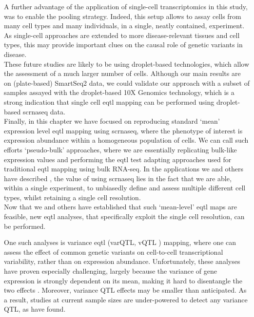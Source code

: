 A further advantage of the application of single-cell transcriptomics in this study, was to enable the pooling strategy. 
Indeed, this setup allows to assay cells from many cell types and many individuals, in a single, neatly contained, experiment.
As single-cell approaches are extended to more disease-relevant tissues and cell types, this may provide important clues on the causal role of genetic variants in disease. \\

These future studies are likely to be using droplet-based technologies, which allow the assessment of a much larger number of cells.
Although our main results are on (plate-based) SmartSeq2 data, we could validate our approach with a subset of samples assayed with the droplet-based 10X Genomics technology, which is a strong indication that single cell \gls{eqtl} mapping can be performed using droplet-based \gls{scrnaseq} data. \\

Finally, in this chapter we have focused on reproducing standard `mean' expression level \gls{eqtl} mapping using \gls{scrnaseq}, where the phenotype of interest is expression abundance within a homogeneous population of cells.
We can call such efforts `pseudo-bulk' approaches, where we are essentially replicating bulk-like expression values and performing the \gls{eqtl} test adapting approaches used for traditional \gls{eqtl} mapping using bulk RNA-seq. 
In the applications we and others have described \cite{van2018single,cuomo2020single}, the value of using \gls{scrnaseq} lies in the fact that we are able, within a single experiment, to unbiasedly define and assess multiple different cell types, whilst retaining a single cell resolution.\\

Now that we and others have established that such `mean-level' \gls{eqtl} maps are feasible, new \gls{eqtl} analyses, that specifically exploit the single cell resolution, can be performed.

One such analyses is variance \gls{eqtl} (varQTL, vQTL \cite{ayroles2015behavioral}) mapping, where one can assess the effect of common genetic variants on cell-to-cell transcriptional variability, rather than on expression abundance.
Unfortunately, these analyses have proven especially challenging, largely because the variance of gene expression is strongly dependent on its mean, making it hard to disentangle the two effects \cite{vallejos2016beyond}.
Moreover, variance QTL effects may be smaller than anticipated.
As a result, studies at current sample sizes are under-powered to detect any variance QTL, as 
\cite{sarkar2019discovery} have found. \\

